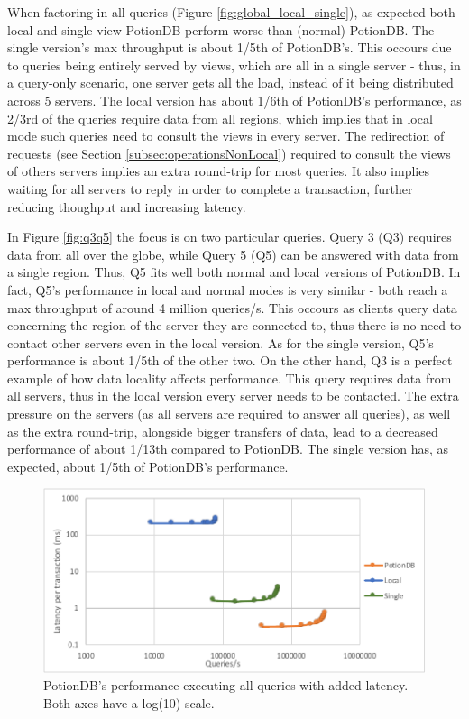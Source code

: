 \documentclass{vldb}
\begin{document}
When factoring in all queries (Figure \ref{fig:global_local_single}), as expected both local and single view PotionDB perform worse than (normal) PotionDB.
The single version's max throughput is about 1/5th of PotionDB's.
This occours due to queries being entirely served by views, which are all in a single server - thus, in a query-only scenario, one server gets all the load, instead of it being distributed across 5 servers.
The local version has about 1/6th of PotionDB's performance, as 2/3rd of the queries require data from all regions, which implies that in local mode such queries need to consult the views in every server.
The redirection of requests (see Section \ref{subsec:operationsNonLocal}) required to consult the views of others servers implies an extra round-trip for most queries. It also implies waiting for all servers to reply in order to complete a transaction, further reducing thoughput and increasing latency.

In Figure \ref{fig:q3q5} the focus is on two particular queries. Query 3 (Q3) requires data from all over the globe, while Query 5 (Q5) can be answered with data from a single region.
Thus, Q5 fits well both normal and local versions of PotionDB.
In fact, Q5's performance in local and normal modes is very similar - both reach a max throughput of around 4 million queries/s.
This occours as clients query data concerning the region of the server they are connected to, thus there is no need to contact other servers even in the local version.
As for the single version, Q5's performance is about 1/5th of the other two.
On the other hand, Q3 is a perfect example of how data locality affects performance.
This query requires data from all servers, thus in the local version every server needs to be contacted. The extra pressure on the servers (as all servers are required to answer all queries), as well as the extra round-trip, alongside bigger transfers of data, lead to a decreased performance of about 1/13th compared to PotionDB.
The single version has, as expected, about 1/5th of PotionDB's performance.

\begin{figure}
	\centering
	\includegraphics[width=.95\linewidth]{clientScale_tc_cut}
	\caption{PotionDB's performance executing all queries with added latency. Both axes have a log(10) scale.}
	\label{fig:global_local_single_tc}
\end{figure}
\end{document}
